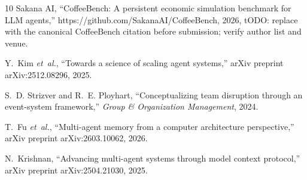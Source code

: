 \documentclass[conference]{IEEEtran}
\begin{document}
\begin{thebibliography}{10}
{Sakana AI}, ``{CoffeeBench}: A persistent economic simulation benchmark for
  {LLM} agents,'' https://github.com/SakanaAI/CoffeeBench, 2026, tODO: replace
  with the canonical CoffeeBench citation before submission; verify author list
  and venue.

Y.~Kim \emph{et~al.}, ``Towards a science of scaling agent systems,'' arXiv
  preprint arXiv:2512.08296, 2025.

S.~D. Strizver and R.~E. Ployhart, ``Conceptualizing team disruption through an
  event-system framework,'' \emph{Group \& Organization Management}, 2024.

T.~Fu \emph{et~al.}, ``Multi-agent memory from a computer architecture
  perspective,'' arXiv preprint arXiv:2603.10062, 2026.

N.~Krishnan, ``Advancing multi-agent systems through model context protocol,''
  arXiv preprint arXiv:2504.21030, 2025.

\end{thebibliography}
\end{document}
